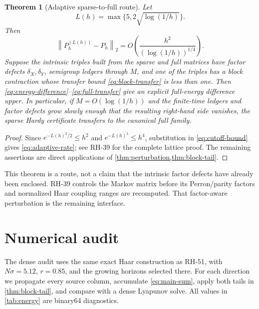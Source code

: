 \documentclass[11pt]{article}
\newtheorem{theorem}{Theorem}[section]
\theoremstyle{remark}
\newcommand{\norm}[1]{\left\lVert #1\right\rVert}
\begin{document}
\begin{theorem}[Adaptive sparse-to-full route]
\label{thm:adaptive}
Let
\begin{equation}
 L(h)=\max\{5,2\sqrt{\log(1/h)}\}.
 \label{eq:adaptive}
\end{equation}
Then
\begin{equation}
 \norm{P_h^{(L(h))}-P_h}_2
 =O\!\left(\frac{h^2}{(\log(1/h))^{1/4}}\right).
 \label{eq:adaptive-rate}
\end{equation}
Suppose the intrinsic triples built from the sparse and full matrices have
factor defects \(\delta_X,\delta_Y\), semigroup ledgers through \(M\), and
one of the triples has a block contraction whose transfer bound
\eqref{eq:block-transfer} is less than one.  Then
\eqref{eq:energy-difference}--\eqref{eq:full-transfer} give an explicit
full-energy difference upper.  In particular, if \(M=O(\log(1/h))\) and the
finite-time ledgers and factor defects grow slowly enough that the resulting
right-hand side vanishes, the sparse Hardy certificate transfers to the
canonical full family.
\end{theorem}

\begin{proof}
Since \(e^{-L(h)^2/2}\le h^2\) and \(e^{-L(h)^2}\le h^4\), substitution in
\eqref{eq:cutoff-bound} gives \eqref{eq:adaptive-rate}; see RH-39 for the
complete lattice proof.  The remaining assertions are direct applications
of \cref{thm:perturbation,thm:block-tail}.
\end{proof}

This theorem is a route, not a claim that the intrinsic factor defects have
already been enclosed.  RH-39 controls the Markov matrix before its
Perron/parity factors and normalized Haar coupling ranges are recomputed.
That factor-aware perturbation is the remaining interface.

\section{Numerical audit}

The dense audit uses the same exact Haar construction as RH-51, with
\(N\sigma=5.12\), \(r=0.85\), and the growing horizons selected there.  For
each direction we propagate every source column, accumulate
\eqref{eq:main-sum}, apply both tails in
\cref{thm:block-tail}, and compare with a dense Lyapunov solve.  All values
in \cref{tab:energy} are binary64 diagnostics.
\end{document}
